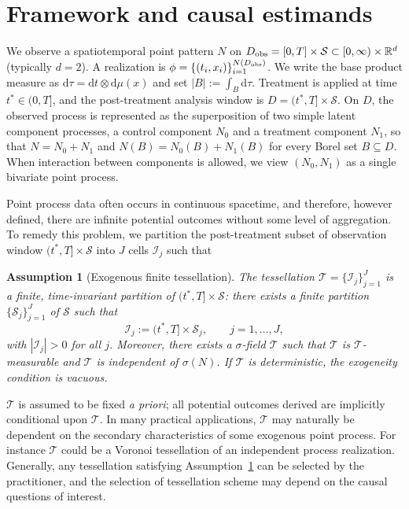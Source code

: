 \documentclass{statsoc}
\newtheorem{assumption}[assumption]{Assumption}
\newcommand{\dd}{\mathrm{d}}
\newcommand{\1}{\mathbbm{1}}
\newcommand{\Tsig}{\mathscr T}
\newcommand{\Nproc}{N}
\newcommand{\Nzero}{N_0}
\newcommand{\None}{N_1}
\begin{document}
\section{Framework and causal estimands}\label{sec:ppFramework}

We observe a spatiotemporal point pattern \(\Nproc\) on \(D_{\rm obs}=[0,T]\times\mathcal S\subset [0,\infty)\times\mathbb R^d\) (typically \(d=2\)). A realization is \(\phi=\{(t_i,x_i)\}_{i=1}^{\Nproc(D_{\rm obs})}\). We write the base product measure as \(\dd\tau=\dd t\otimes\dd\mu(x)\) and set \(|B|:=\int_B \dd\tau\). Treatment is applied at time \(t^\ast\in(0,T]\), and the post-treatment analysis window is \(D=(t^\ast,T]\times\mathcal S\). On \(D\), the observed process is represented as the superposition of two simple latent component processes, a control component \(\Nzero\) and a treatment component \(\None\), so that \(\Nproc=\Nzero+\None\) and \(\Nproc(B)=\Nzero(B)+\None(B)\) for every Borel set \(B\subseteq D\). When interaction between components is allowed, we view \((\Nzero,\None)\) as a single bivariate point process.

Point process data often occurs in continuous spacetime, and therefore, however defined, there are infinite potential outcomes without some level of aggregation. To remedy this problem, we partition the post-treatment subset of observation window $(t^\ast,T]\times \mathcal{S}$ into $J$ cells $\mathcal{I}_j$ such that

\begin{assumption}[Exogenous finite tessellation]\label{ass:tessellation}
The tessellation $\mathcal T=\{\mathcal I_j\}_{j=1}^J$ is a finite, time-invariant partition of $(t^\ast,T]\times\mathcal S$: there exists a finite partition $\{\mathcal S_j\}_{j=1}^J$ of $\mathcal S$ such that
\[
\mathcal I_j := (t^\ast,T]\times \mathcal S_j,\qquad j=1,\ldots,J,
\]
with $|\mathcal I_j|>0$ for all $j$. Moreover, there exists a $\sigma$-field $\Tsig$ such that $\mathcal T$ is $\Tsig$-measurable and $\Tsig$ is independent of $\sigma(\Nproc)$. If $\mathcal T$ is deterministic, the exogeneity condition is vacuous.
\end{assumption}

$\mathcal{T}$ is assumed to be fixed \textit{a priori}; all potential outcomes derived are implicitly conditional upon $\mathcal{T}$. In many practical applications, $\mathcal{T}$ may naturally be dependent on the secondary characteristics of some exogenous point process. For instance $\mathcal{T}$ could be a Voronoi tessellation of an independent process realization. Generally, any tessellation satisfying Assumption~\ref{ass:tessellation} can be selected by the practitioner, and the selection of tessellation scheme may depend on the causal questions of interest. %
\end{document}
